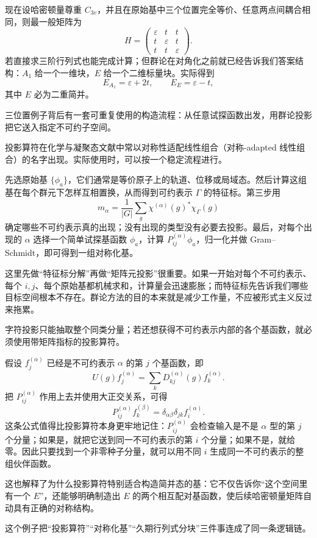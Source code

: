 现在设哈密顿量尊重 $C_{3v}$，并且在原始基中三个位置完全等价、任意两点间耦合相同，则最一般矩阵为
\[
H=
\begin{pmatrix}
\varepsilon&t&t\\
t&\varepsilon&t\\
t&t&\varepsilon
\end{pmatrix}.
\]
若直接求三阶行列式也能完成计算；但群论在对角化之前就已经告诉我们答案结构：$A_1$ 给一个一维块，$E$ 给一个二维标量块。实际得到
\[
E_{A_1}=\varepsilon+2t,
\qquad
E_E=\varepsilon-t,
\]
其中 $E$ 必为二重简并。

三位置例子背后有一套可重复使用的构造流程：从任意试探函数出发，用群论投影把它送入指定不可约子空间。

投影算符在化学与凝聚态文献中常以对称性适配线性组合（对称-adapted 线性组合）的名字出现。实际使用时，可以按一个稳定流程进行。

先选原始基 $\{\phi_a\}$，它们通常是等价原子上的轨道、位移或局域态。然后计算这组基在每个群元下怎样互相置换，从而得到可约表示 $\Gamma$ 的特征标。第三步用
\[
m_\alpha
=\frac1{|G|}\sum_g\chi^{(\alpha)}(g)^*\chi_\Gamma(g)
\]
确定哪些不可约表示真的出现；没有出现的类型没有必要去投影。最后，对每个出现的 $\alpha$ 选择一个简单试探基函数 $\phi_a$，计算 $P_{ij}^{(\alpha)}\phi_a$，归一化并做 Gram--Schmidt，即可得到一组对称化基。

这里先做“特征标分解”再做“矩阵元投影”很重要。如果一开始对每个不可约表示、每个 $i,j$、每个原始基都机械求和，计算量会迅速膨胀；而特征标先告诉我们哪些目标空间根本不存在。群论方法的目的本来就是减少工作量，不应被形式主义反过来拖累。

字符投影只能抽取整个同类分量；若还想获得不可约表示内部的各个基函数，就必须使用带矩阵指标的投影算符。

假设 $f_j^{(\alpha)}$ 已经是不可约表示 $\alpha$ 的第 $j$ 个基函数，即
\[
U(g)f_j^{(\alpha)}
=\sum_k D_{kj}^{(\alpha)}(g)f_k^{(\alpha)}.
\]
把 $P_{ij}^{(\alpha)}$ 作用上去并使用大正交关系，可得
\[
P_{ij}^{(\alpha)}f_k^{(\beta)}
=\delta_{\alpha\beta}\delta_{jk}f_i^{(\alpha)}.
\label{eq:matrix-projector-action}
\]
这条公式值得比投影算符本身更牢地记住：$P_{ij}^{(\alpha)}$ 会检查输入是不是 $\alpha$ 型的第 $j$ 个分量；如果是，就把它送到同一不可约表示的第 $i$ 个分量；如果不是，就给零。因此只要找到一个非零种子分量，就可以用不同 $i$ 生成同一不可约表示的整组伙伴函数。

这也解释了为什么投影算符特别适合构造简并态的基：它不仅告诉你“这个空间里有一个 $E$”，还能够明确制造出 $E$ 的两个相互配对基函数，使后续哈密顿量矩阵自动具有正确的对称结构。

这个例子把“投影算符”“对称化基”“久期行列式分块”三件事连成了同一条逻辑链。

